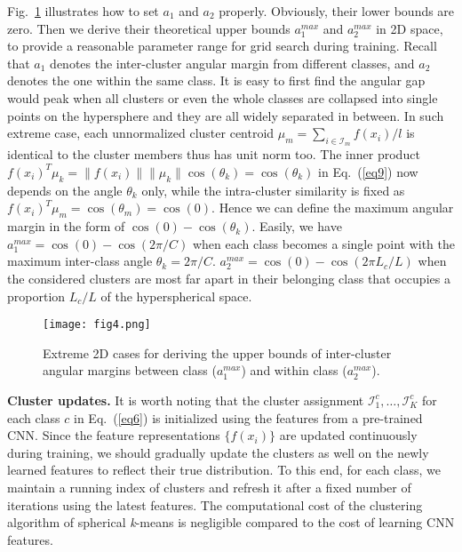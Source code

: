 \documentclass[10pt,journal,compsoc]{IEEEtran}
\begin{document}
Fig.~\ref{fig4} illustrates how to set $a_1$ and $a_2$ properly. Obviously, their lower bounds are zero. Then we derive their theoretical upper bounds $a_1^{max}$ and $a_2^{max}$ in 2D space, to provide a reasonable parameter range for grid search during training. Recall that $a_1$ denotes the inter-cluster angular margin from different classes, and $a_2$ denotes the one within the same class. It is easy to first find the angular gap would peak when all clusters or even the whole classes are collapsed into single points on the hypersphere and they are all widely separated in between. In such extreme case, each unnormalized cluster centroid $\mu_m=\sum_{i \in \mathcal{I}_m}f(x_i)/l$ is identical to the cluster members thus has unit norm too. The inner product $f(x_i)^T \mu_k=\| f(x_i)\|\| \mu_k\| \cos(\theta_k)=\cos(\theta_k)$ in Eq.~(\ref{eq9}) now depends on the angle $\theta_k$ only, while the intra-cluster similarity is fixed as $f(x_i)^T \mu_m=\cos(\theta_m)=\cos(0)$. Hence we can define the maximum angular margin in the form of $\cos(0)-\cos(\theta_k)$. Easily, we have $a_1^{max}=\cos(0)-\cos(2\pi /C)$ when each class becomes a single point with the maximum inter-class angle $\theta_k=2\pi /C$. $a_2^{max}=\cos(0)-\cos(2\pi L_c/L)$ when the considered clusters are most far apart in their belonging class that occupies a proportion $L_c/L$ of the hyperspherical space.


\begin{figure}[t]
\begin{center}
\texttt{[image: fig4.png]}
\end{center}
\vspace{-1.5em}
\caption{Extreme 2D cases for deriving the upper bounds of inter-cluster angular margins between class ($a_1^{max}$) and within class ($a_2^{max}$).}
\vspace{-0.8em}
\label{fig4}
\end{figure}

\noindent
{\bf Cluster updates.} It is worth noting that the cluster assignment $\mathcal{I}_1^c,\dots,\mathcal{I}_K^c$ for each class $c$ in Eq.~(\ref{eq6}) is initialized using the features from a pre-trained CNN. Since the feature representations $\{f(x_i)\}$ are updated continuously during training, we should gradually update the clusters as well on the newly learned features to reflect their true distribution. To this end, for each class, we maintain a running index of clusters and refresh it after a fixed number of iterations using the latest features. The computational cost of the clustering algorithm of spherical \textit{k}-means is negligible compared to the cost of learning CNN features.
\end{document}
